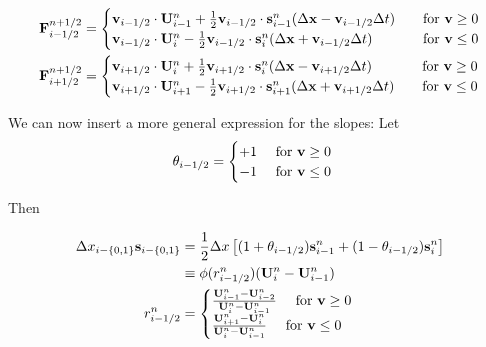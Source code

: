 \begin{align*}
	\mathbf{F}_{i-1/2}^{n+1/2} &= 
		\begin{cases}
			\mathbf{v}_{i-1/2} \cdot \mathbf{U}_{i-1}^n +  \frac{1}{2} \mathbf{v}_{i-1/2} \cdot\mathbf{s}_{i-1}^n (\Delta \mathbf{x} -  \mathbf{v}_{i-1/2} \Delta t)
			 	& \quad \text{for } \mathbf{v} \geq 0 \\
			\mathbf{v}_{i-1/2} \cdot \mathbf{U}_{i}^n -\frac{1}{2} \mathbf{v}_{i-1/2} \cdot \mathbf{s}_{i}^n (\Delta \mathbf{x} + \mathbf{v}_{i-1/2} \Delta t)
				& \quad \text{for } \mathbf{v} \leq 0 \\
		\end{cases} \\
	\mathbf{F}_{i+1/2}^{n+1/2} &= 
		\begin{cases}
			\mathbf{v}_{i+1/2} \cdot \mathbf{U}_{i}^n +  \frac{1}{2} \mathbf{v}_{i+1/2} \cdot\mathbf{s}_{i}^n (\Delta \mathbf{x} -  \mathbf{v}_{i+1/2} \Delta t)
			 	& \quad \text{for } \mathbf{v} \geq 0 \\
			\mathbf{v}_{i+1/2} \cdot \mathbf{U}_{i+1}^n -\frac{1}{2} \mathbf{v}_{i+1/2} \cdot \mathbf{s}_{i+1}^n (\Delta \mathbf{x} + \mathbf{v}_{i+1/2} \Delta t)
				& \quad \text{for } \mathbf{v} \leq 0 \\
		\end{cases} \\		
\end{align*}




We can now insert a more general expression for the slopes: Let 
\begin{align}
	\theta_{i-1/2} = \begin{cases} +1 \quad \text{ for } \mathbf{v} \geq 0 \\ -1 \quad  \text{ for } \mathbf{v} \leq{0} \end{cases}
\end{align}

Then



\begin{align}
	\Delta x_{i-\{0, 1\}} \mathbf{s}_{i-\{0,1\}} 
		&= \frac{1}{2} \Delta x \left[ (1 + \theta_{i-1/2}) \mathbf{s}_{i-1}^n + (1 - \theta_{i-1/2})  \mathbf{s}_{i}^n \right]  \\
	&\equiv \phi(r_{i-1/2}^n) (\mathbf{U}_i^n - \mathbf{U}_{i-1}^n ) \\
	r^n_{i-1/2} &= \begin{cases}
		\frac{\mathbf{U}_{i-1}^n - \mathbf{U}_{i-2}^n}{\mathbf{U}_{i}^n - \mathbf{U}_{i-1}^n} 	\quad \text{ for } \mathbf{v}  \geq 0 \\
		\frac{\mathbf{U}_{i+1}^n - \mathbf{U}_{i}^n}{\mathbf{U}_{i}^n - \mathbf{U}_{i-1}^n} 	\quad \text{ for } \mathbf{v}  \leq 0 \\
	\end{cases} 
\end{align}

